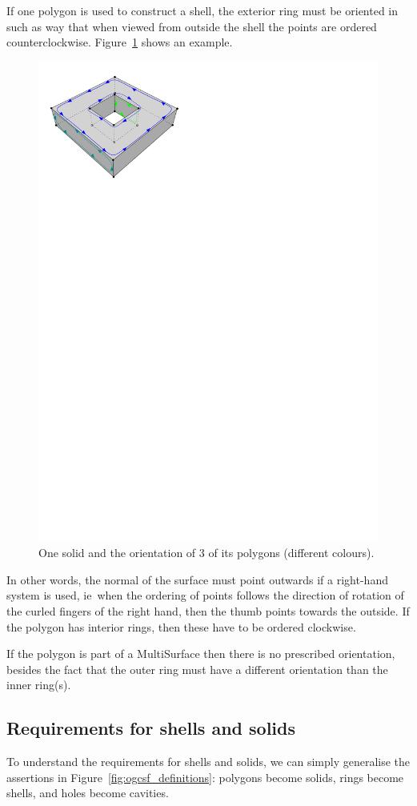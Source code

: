 \documentclass[a4paper,parskip=half,11pt]{scrartcl}
\newcommand{\ie}{ie}
\begin{document}
If one polygon is used to construct a shell, the exterior ring must be oriented in such as way that when viewed from outside the shell the points are ordered counterclockwise.
Figure~\ref{fig:orientation} shows an example.
\begin{figure}
  \centering
  \includegraphics[width=0.5\linewidth]{figs/orientation.pdf}
  \caption{One solid and the orientation of 3 of its polygons (different colours).}
\label{fig:orientation}
\end{figure}
In other words, the normal of the surface must point outwards if a right-hand system is used, \ie\ when the ordering of points follows the direction of rotation of the curled fingers of the right hand, then the thumb points towards the outside.
If the polygon has interior rings, then these have to be ordered clockwise.

If the polygon is part of a MultiSurface then there is no prescribed orientation, besides the fact that the outer ring must have a different orientation than the inner ring(s).



\subsection{Requirements for shells and solids}

To understand the requirements for shells and solids, we can simply generalise the assertions in Figure~\ref{fig:ogcsf_definitions}: polygons become solids, rings become shells, and holes become cavities.
\end{document}
